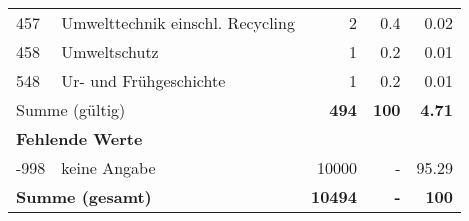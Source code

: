 \begin{longtable}{lXrrr}
        457 & \multicolumn{1}{X}{Umwelttechnik einschl. Recycling} & %
          \num{2} &
          \num[round-mode=places,round-precision=2]{0,4} &
          \num[round-mode=places,round-precision=2]{0,02} \\

        458 & \multicolumn{1}{X}{Umweltschutz} & %
          \num{1} &
          \num[round-mode=places,round-precision=2]{0,2} &
          \num[round-mode=places,round-precision=2]{0,01} \\

        548 & \multicolumn{1}{X}{Ur- und Frühgeschichte} & %
          \num{1} &
          \num[round-mode=places,round-precision=2]{0,2} &
          \num[round-mode=places,round-precision=2]{0,01} \\

     \midrule
     \multicolumn{2}{l}{Summe (gültig)} &
       \textbf{\num{494}} &
     \textbf{100} &
       \textbf{\num[round-mode=places,round-precision=2]{4,71}} \\
     \multicolumn{5}{l}{\textbf{Fehlende Werte}}\\
       -998 &
       keine Angabe &
         \num{10000} &
        - &
         \num[round-mode=places,round-precision=2]{95,29} \\
     \midrule
     \multicolumn{2}{l}{\textbf{Summe (gesamt)}} &
          \textbf{\num{10494}} &
        \textbf{-} &
        \textbf{100} \\
     \bottomrule
     \end{longtable}
     
